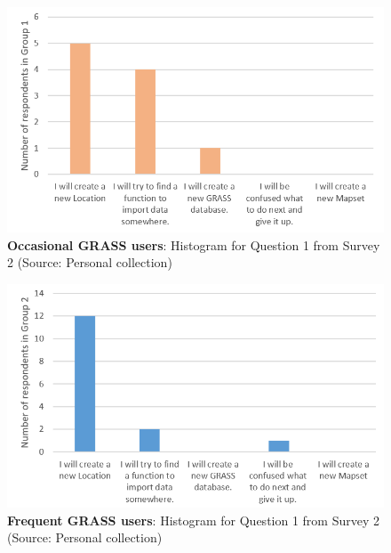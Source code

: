\documentclass[a4paper,10pt,twoside]{article}
\begin{document}
\vspace{0.3cm}
\begin{figure}[hbt!] 
\begin{center}
\includegraphics[width=14cm]{../surveys/analyzed_data/survey2_question1_histogram_group1.png} 
\caption[\textbf{Occasional GRASS users}: Histogram for Question 1 from Survey 2]{\textbf{Occasional GRASS users}: Histogram for Question 1 from Survey 2 (Source: Personal collection)}
\label{fig:survey2_question1_histogram_group1}
\end{center}
\end{figure}

\vspace{0.3cm}
\begin{figure}[hbt!] 
\begin{center}
\includegraphics[width=13.5cm]{../surveys/analyzed_data/survey2_question1_histogram_group2.png} 
\caption[\textbf{Frequent GRASS users}: Histogram for Question 1 from Survey 2]{\textbf{Frequent GRASS users}: Histogram for Question 1 from Survey 2 (Source: Personal collection)}
\label{fig:survey2_question1_histogram_group2}
\end{center}
\end{figure}
\end{document}
